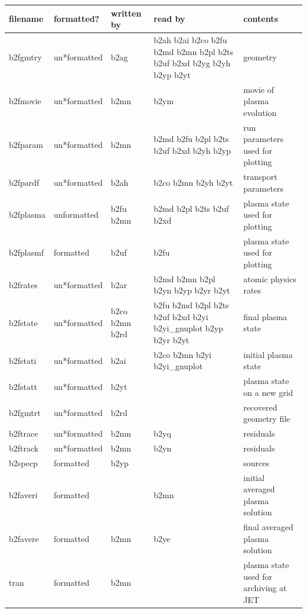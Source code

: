\documentclass[a4paper,10pt]{report}
\begin{document}
\begin{table}[hbtp]
  \leavevmode
  \begin{center}
\begin{tabular}{l|l|l|p{4cm}|p{4cm}}
filename & formatted? & written by & read by & contents \\ \hline
b2fgmtry \index{b2fgmtry} & un*formatted & b2ag & b2ah b2ai b2co b2fu b2md b2mn b2pl b2ts b2uf b2xd b2yg b2yh b2yp b2yt & geometry \\
b2fmovie \index{b2fmovie} & un*formatted & b2mn & b2ym & movie of plasma evolution \\
b2fparam \index{b2fparam} & un*formatted & b2mn & b2md b2fu b2pl b2ts b2uf b2xd b2yh b2yp & run parameters used for plotting \\
b2fpardf \index{b2fpardf} & un*formatted & b2ah & b2co b2mn b2yh b2yt & transport parameters \\
b2fplasma \index{b2fplasma} & unformatted & b2fu b2mn & b2md b2pl b2ts b2uf b2xd & plasma state used for plotting \\
b2fplasmf \index{b2fplasmf} & formatted & b2uf & b2fu & plasma state used for plotting \\
b2frates \index{b2frates} & un*formatted & b2ar & b2md b2mn b2pl b2yn b2yp b2yr b2yt & atomic physics rates \\
b2fstate \index{b2fstate} & un*formatted & b2co b2mn b2rd & b2fu b2md b2pl b2ts b2uf b2xd b2yi b2yi\_gnuplot b2yp b2yr b2yt & final plasma state \\
b2fstati \index{b2fstati} & un*formatted & b2ai & b2co b2mn b2yi b2yi\_gnuplot & initial plasma state \\
b2fstatt \index{b2fstatt} & un*formatted & b2yt & & plasma state on a new grid \\
b2fgmtrt \index{b2fgmtrt} & un*formatted & b2rd & & recovered geometry file \\
b2ftrace \index{b2ftrace} & un*formatted & b2mn & b2yq & residuals \\
b2ftrack \index{b2ftrack} & un*formatted & b2mn & b2yn & residuals \\
b2specp \index{b2specp} & formatted & b2yp & & sources \\
b2faveri \index{b2faveri} & formatted & & b2mn & initial averaged plasma solution \\
b2favere \index{b2favere} & formatted & b2mn & b2ye & final averaged plasma solution \\
tran \index{tran} & formatted & b2mn & & plasma state used for archiving at JET \\
\end{tabular}
  \end{center}
\end{table}
\end{document}
